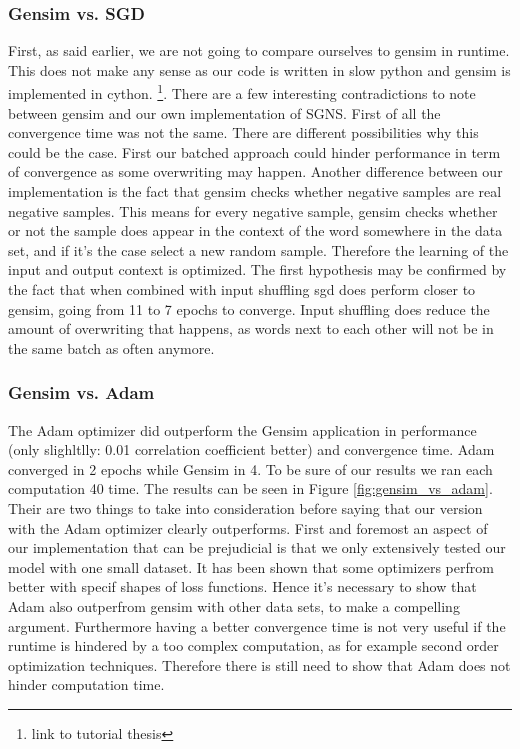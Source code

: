 \subsubsection{Gensim vs. SGD}
First, as said earlier, we are not going to compare ourselves to gensim in runtime. This does not make any sense as our code is written in slow python and gensim is implemented in cython. \footnote{link to tutorial thesis}. 
There are a few interesting contradictions to note between gensim and our own implementation of SGNS. First of all the convergence time was not the same. There are different possibilities why this could be the case. First our batched approach could hinder performance in term of convergence as some overwriting may happen. Another difference between our implementation is the fact that gensim checks whether negative samples are real negative samples. This means for every negative sample, gensim checks whether or not the sample does appear in the context of the word somewhere in the data set, and if it's the case select a new random sample. Therefore the learning of the input and output context is optimized. 
The first hypothesis may be confirmed by the fact that when combined with input shuffling sgd does perform closer to gensim, going from 11 to 7 epochs to converge. Input shuffling does reduce the amount of overwriting that happens, as words next to each other will not be in the same batch as often anymore. 

\subsubsection{Gensim vs. Adam}
The Adam optimizer did outperform the Gensim application in performance (only slighltlly: 0.01 correlation coefficient better) and convergence time. Adam converged in 2 epochs while Gensim in 4. To be sure of our results we ran each computation 40 time. The results can be  seen in Figure \ref{fig:gensim_vs_adam}.
Their are two things to take into consideration before saying that our version with the Adam optimizer clearly outperforms.
First and foremost an aspect of our implementation that can be prejudicial is that we only extensively tested our model with one small dataset. It has been shown that some optimizers perfrom better with specif shapes of loss functions. Hence it's necessary to show that Adam also outperfrom gensim with other data sets, to make a compelling argument. 
Furthermore having a better convergence time is not very useful if the runtime is hindered by a too complex computation, as for example second order optimization techniques. Therefore there is still need to show that Adam does not hinder computation time. 



